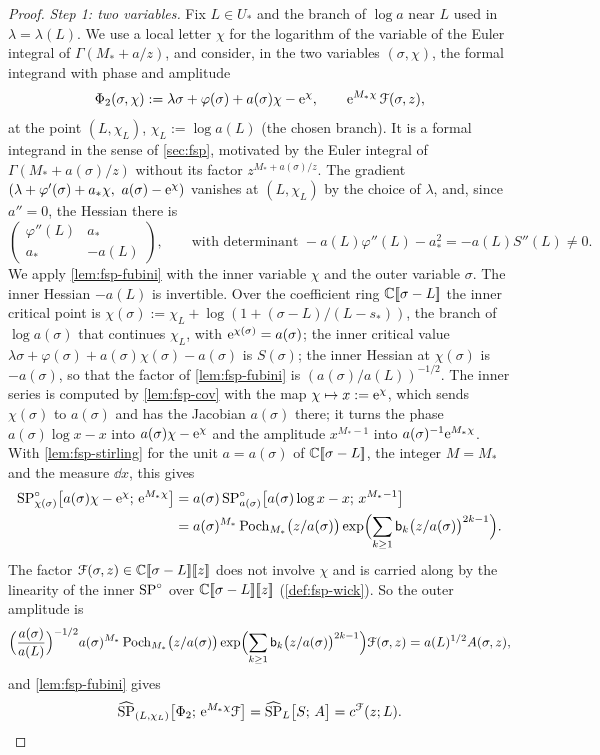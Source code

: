 \begin{proof}
\emph{Step 1: two variables.} Fix $L\in U_*$ and the branch of $\log a$ near $L$ used in $\lambda=\lambda(L)$. We use a local letter $\chi$ for the logarithm of the variable of the Euler integral of $\Gamma(M_*+a/z)$, and consider, in the two variables $(\sigma,\chi)$, the formal integrand with phase and amplitude
\[
\Phi_2(\sigma,\chi):=\lambda\sigma+\varphi(\sigma)+a(\sigma)\chi-\mathrm{e}^{\chi},\qquad \mathrm{e}^{M_*\chi}\,\mathcal{F}(\sigma,z),
\]
at the point $(L,\chi_L)$, $\chi_L:=\log a(L)$ (the chosen branch). It is a formal integrand in the sense of \cref{sec:fsp}, motivated by the Euler integral of $\Gamma(M_*+a(\sigma)/z)$ without its factor $z^{M_*+a(\sigma)/z}$. The gradient $(\lambda+\varphi'(\sigma)+a_*\chi,\ a(\sigma)-\re^{\chi})$ vanishes at $(L,\chi_L)$ by the choice of $\lambda$, and, since $a''=0$, the Hessian there is
\[
\begin{pmatrix}\varphi''(L)&a_*\\ a_*&-a(L)\end{pmatrix},\qquad\text{with determinant }-a(L)\varphi''(L)-a_*^2=-a(L)S''(L)\neq 0.
\]
We apply \cref{lem:fsp-fubini} with the inner variable $\chi$ and the outer variable $\sigma$. The inner Hessian $-a(L)$ is invertible. Over the coefficient ring $\mathbb{C}[\![ \sigma-L ]\!]$ the inner critical point is $\chi(\sigma):=\chi_L+\log(1+(\sigma-L)/(L-s_*))$, the branch of $\log a(\sigma)$ that continues $\chi_L$, with $\mathrm{e}^{\chi(\sigma)}=a(\sigma)$; the inner critical value $\lambda\sigma+\varphi(\sigma)+a(\sigma)\chi(\sigma)-a(\sigma)$ is $S(\sigma)$; the inner Hessian at $\chi(\sigma)$ is $-a(\sigma)$, so that the factor of \cref{lem:fsp-fubini} is $(a(\sigma)/a(L))^{-1/2}$. The inner series is computed by \cref{lem:fsp-cov} with the map $\chi\mapsto x:=\mathrm{e}^{\chi}$, which sends $\chi(\sigma)$ to $a(\sigma)$ and has the Jacobian $a(\sigma)$ there; it turns the phase $a(\sigma)\log x-x$ into $a(\sigma)\chi-\mathrm{e}^{\chi}$ and the amplitude $x^{M_*-1}$ into $a(\sigma)^{-1}\mathrm{e}^{M_*\chi}$. With \cref{lem:fsp-stirling} for the unit $a=a(\sigma)$ of $\mathbb{C}[\![ \sigma-L ]\!]$, the integer $M=M_*$ and the measure $\dd x$, this gives
\begin{align*}
\mathrm{SP}^{\circ}_{\chi(\sigma)}\bigl[a(\sigma)\chi-\mathrm{e}^{\chi};\,\mathrm{e}^{M_*\chi}\bigr]&=a(\sigma)\,\mathrm{SP}^{\circ}_{a(\sigma)}\bigl[a(\sigma)\log x-x;\,x^{M_*-1}\bigr]\\
&=a(\sigma)^{M_*}\,\mathrm{Poch}_{M_*}\bigl(z/a(\sigma)\bigr)\exp\Bigl(\sum_{k\geq 1}\mathsf{b}_k\bigl(z/a(\sigma)\bigr)^{2k-1}\Bigr).
\end{align*}
The factor $\mathcal{F}(\sigma,z)\in\mathbb{C}[\![ \sigma-L ]\!][\![ z ]\!]$ does not involve $\chi$ and is carried along by the linearity of the inner $\mathrm{SP}^{\circ}$ over $\mathbb{C}[\![ \sigma-L ]\!][\![ z ]\!]$ (\cref{def:fsp-wick}). So the outer amplitude is
\[
\Bigl(\frac{a(\sigma)}{a(L)}\Bigr)^{-1/2}a(\sigma)^{M_*}\,\mathrm{Poch}_{M_*}\bigl(z/a(\sigma)\bigr)\exp\Bigl(\sum_{k\geq1}\mathsf{b}_k\bigl(z/a(\sigma)\bigr)^{2k-1}\Bigr)\mathcal{F}(\sigma,z)=a(L)^{1/2}A(\sigma,z),
\]
and \cref{lem:fsp-fubini} gives
\begin{equation}
\label{eq:gam-step1}
\widehat{\mathrm{SP}}_{(L,\chi_L)}\bigl[\Phi_2;\,\mathrm{e}^{M_*\chi}\mathcal{F}\bigr]=\widehat{\mathrm{SP}}_L\bigl[S;\,A\bigr]=c^{\mathcal{F}}(z;L).
\end{equation}


\end{proof}

